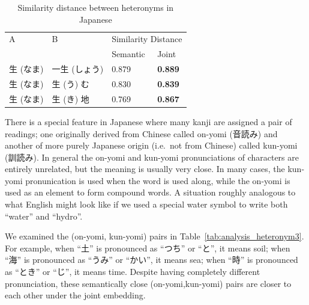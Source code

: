 \vspace{0.4cm}    
\begin{table}[h]
    \centering
    \begin{CJK}{UTF8}{ipxm}
        \begin{tabularx}{\textwidth}{bbbb}
            \toprule
            \multirow{2.5}{*}{A} & \multirow{2.5}{*}{B} & \multicolumn{2}{c}{Similarity Distance} \\
            \cmidrule(lr){3-4} {} & {} & Semantic & Joint \\\midrule
            生 (なま) & 一生 (しょう) & 0.879 & \textbf{0.889} \\
            生 (なま) & 生 (う) む & 0.830 & \textbf{0.839} \\
            生 (なま) & 生 (き) 地 & 0.769 & \textbf{0.867} \\\bottomrule
        \end{tabularx}
    \end{CJK}
    \caption{Similarity distance between heteronyms in Japanese}
    \label{tab:analysis_heteronym2}
\end{table}

\begin{CJK}{UTF8}{ipxm}
    There is a special feature in Japanese where many kanji are assigned a pair of readings; one originally derived from Chinese called on-yomi (音読み) and another of more purely Japanese origin (i.e.\ not from Chinese) called kun-yomi (訓読み).  In general the on-yomi and kun-yomi pronunciations of characters are entirely unrelated, but the meaning is usually very close.  In many cases, the kun-yomi pronunication is used when the word is used along, while the on-yomi is used as an element to form compound words.  A situation roughly analogous to what English might look like if we used a special water symbol to write both ``water'' and ``hydro''.  

We examined the (on-yomi, kun-yomi) pairs in Table~\ref{tab:analysis_heteronym3}. For example, when ``土'' is pronounced as ``つち'' or ``と'', it means soil; when ``海'' is pronounced as ``うみ'' or ``かい'', it means sea; when ``時'' is pronounced as ``とき'' or ``じ'', it means time.  Despite having completely different pronunciation, these semantically close (on-yomi,kun-yomi) pairs are closer to each other under the joint embedding.
\end{CJK}

